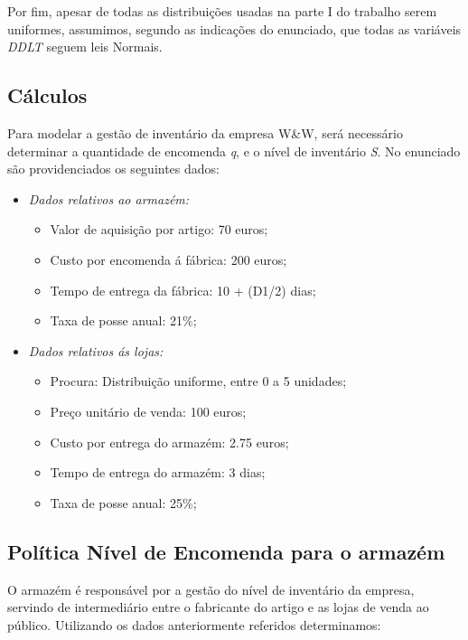 Por fim, apesar de todas as distribuições usadas na parte I do trabalho serem uniformes, assumimos, segundo as indicações do enunciado, que todas as variáveis \emph{DDLT} seguem leis Normais. 

\newpage

\subsection{Cálculos}

Para modelar a gestão de inventário da empresa W\&W, será necessário determinar a quantidade de encomenda \emph{q}, e o nível de inventário \emph{S}. No enunciado são providenciados os seguintes dados:

\begin{itemize}
	\item \emph{Dados relativos ao armazém:}
		\begin{itemize}
			\item Valor de aquisição por artigo: 70 euros;
			\item Custo por encomenda á fábrica: 200 euros;
			\item Tempo de entrega da fábrica: 10 + (D1/2) dias;
			\item Taxa de posse anual: 21\%;
		\end{itemize}
	\item \emph{Dados relativos ás lojas:}
		\begin{itemize}
			\item Procura: Distribuição uniforme, entre 0 a 5 unidades;
			\item Preço unitário de venda: 100 euros;
			\item Custo por entrega do armazém: 2.75 euros;
			\item Tempo de entrega do armazém: 3 dias;
			\item Taxa de posse anual: 25\%;
		\end{itemize}
\end{itemize}

\subsection{Política Nível de Encomenda para o armazém}

O armazém é responsável por a gestão do nível de inventário da empresa, servindo de intermediário entre o fabricante do artigo e as lojas de venda ao público. Utilizando os dados anteriormente referidos determinamos:

